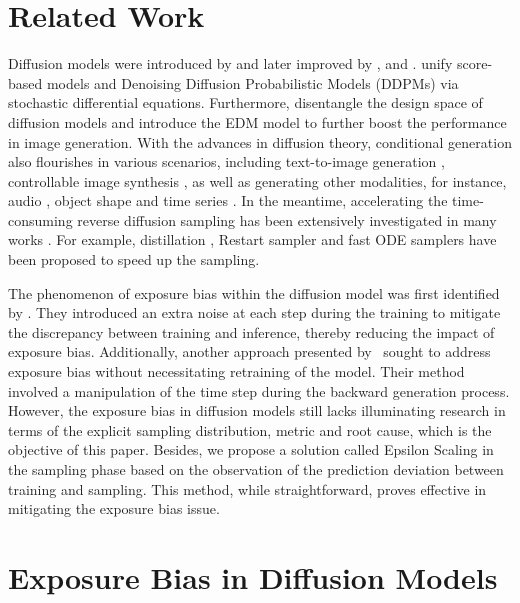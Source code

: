 \documentclass{article} \usepackage{iclr2024_conference,times}
\begin{document}
\section{Related Work}
Diffusion models were introduced by \citet{pmlr-v37-sohl-dickstein15} and later improved by \citet{song2019generative}, \citet{DDPM} and \citet{IDDPM}. \citet{VPVE} unify score-based models and Denoising Diffusion Probabilistic Models (DDPMs) via stochastic differential equations. Furthermore, \citet{karras2022elucidating} disentangle the design space of diffusion models and introduce the EDM model to further boost the performance in image generation. With the advances in diffusion theory, conditional generation \citep{ho2022classifier, choi2021ilvr} also flourishes in various scenarios, including text-to-image generation \citep{nichol2022glide, DALL-E-2, LDM, Imagen}, controllable image synthesis \citep{zhang2023adding, li2023gligen, zheng2023layoutdiffusion}, as well as generating other modalities, for instance, audio \citep{wavegrad, diffwave}, object shape \citep{zhou20213d} and time series \citep{rasul2021autoregressive}. In the meantime, accelerating the time-consuming reverse diffusion sampling has been extensively investigated in many works \citep{DDIM,lu2022dpm,liu2022pseudo}. For example, distillation \citep{DBLP:conf/iclr/SalimansH22}, Restart sampler \citep{xu2023restart} and fast ODE samplers \citep{zhao2023unipc} have been proposed to speed up the sampling.


The phenomenon of exposure bias within the diffusion model was first identified by \citet{ning2023input}. They introduced an extra noise at each step during the training to mitigate the discrepancy between training and inference, thereby reducing the impact of exposure bias. Additionally, another approach presented by~\citet{li2023alleviating} sought to address exposure bias without necessitating retraining of the model. Their method involved a manipulation of the time step during the backward generation process. However, the exposure bias in diffusion models still lacks illuminating research in terms of the explicit sampling distribution, metric and root cause, which is the objective of this paper. Besides, we propose a solution called Epsilon Scaling in the sampling phase based on the observation of the prediction deviation between training and sampling. This method, while straightforward, proves effective in mitigating the exposure bias issue.



\section{Exposure Bias in Diffusion Models}
\label{sec: Exposure Bias in Diffusion Models}
\end{document}
